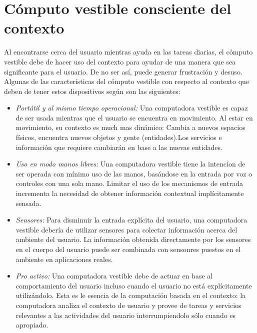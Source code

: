 \documentclass[letterpaper,12pt]{cicese}
\begin{document}
			\section{C\'omputo vestible consciente del contexto}
				Al encontrarse cerca del usuario mientras ayuda en las tareas diarias, el c\'omputo vestible debe de hacer uso del contexto para ayudar de una manera
				que sea significante para el usuario. De no ser as\'i, puede generar frustraci\'on y desuso. Algunas de las caracter\'isticas del c\'omputo vestible
				con respecto al contexto que deben de tener estos dispositivos seg\'un \citep{Rhodes97thewearable} son las siguientes:
				\begin{itemize}
					\item{\emph{Port\'atil y al mismo tiempo operacional:}} Una computadora vestible es capaz de ser usada mientras que el usuario se encuentra
					en movimiento. Al estar en movimiento, su contexto es much mas din\'amico: Cambia a nuevos espacios f\'isicos, encuentra nuevos objetos 
					y gente (entidades).Los servicios e informaci\'on que requiere cambiar\'an en base a las nuevas entidades.
				\end{itemize}
				\begin{itemize}
					\item{\emph{Uso en modo manos libres:}} Una computadora vestible tiene la intenc\'ion de ser operada con m\'inimo uso de las manos,
					bas\'andose en la entrada por voz o controles con una sola mano. Limitar el uso de los mecanismos de entrada incrementa la necesidad
					de obtener informaci\'on contextual impl\'icitamente sensada.
				\end{itemize}
				\begin{itemize}
					\item{\emph{Sensores:}} Para disminuir la entrada expl\'icita del usuario, una computadora vestible deber\'ia de utilizar sensores para
					colectar informaci\'on acerca del ambiente del usuario. La informaci\'on obtenida directamente por los sensores en el cuerpo del
					usuario puede ser combinada con sensonres puestos en el ambiente en aplicaciones reales.
				\end{itemize}
				\begin{itemize}
					\item{\emph{Pro activo:}} Una computadora vestible debe de actuar en base al comportamiento del usuario incluso cuando el usuario no
					est\'a expl\'icitamente utiliz\'andolo. Esta es le esencia de la computaci\'on basada en el contexto: la computadora analiza el
					contexto de usuario y provee de tareas y servicios relevantes a las actividades del usuario interrumpiendolo s\'olo cuando es apropiado.
				\end{itemize}
\end{document}

